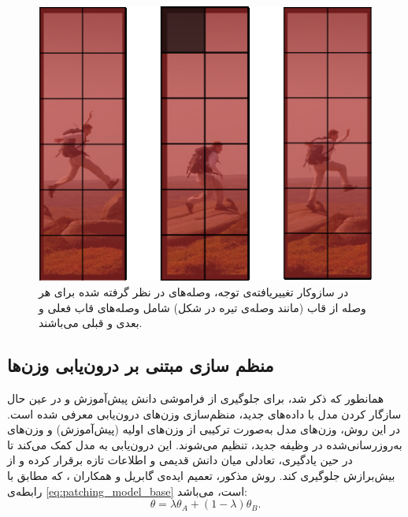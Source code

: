 ‌\begin{figure}
	\centering\includegraphics[scale=.50]{Images/Chapter3/openvclip_attention.png}
	\caption[]{در سازوکار تغییریافته‌ی توجه، وصله‌های در نظر گرفته شده برای هر وصله از قاب (مانند وصله‌ی تیره در شکل) شامل وصله‌های قاب فعلی و بعدی و قبلی می‌باشند.}
	\label{fig.31}
\end{figure}

\subsection{منظم سازی مبتنی بر درون‌یابی وزن‌ها}
همانطور که ذکر شد، برای جلوگیری از فراموشی دانش پیش‌آموزش و در عین حال سازگار کردن مدل با داده‌های جدید، منظم‌سازی وزن‌های درون‌یابی معرفی شده است. در این روش، وزن‌های مدل به‌صورت ترکیبی از وزن‌های اولیه (پیش‌آموزش) و وزن‌های به‌روزرسانی‌شده در وظیفه جدید، تنظیم می‌شوند. این درون‌یابی به مدل کمک می‌کند تا در حین یادگیری، تعادلی میان دانش قدیمی و اطلاعات تازه برقرار کرده و از بیش‌برازش
  جلوگیری کند. روش مذکور، تعمیم ایده‌ی گابریل و همکاران
  \cite{patchingmodels}،
 که مطابق با رابطه‌ی \eqref{eq:patching_model_base} است، می‌باشد:
\begin{equation}\label{eq:patching_model_base}
\theta = \lambda \theta_A + (1 - \lambda) \theta_B.
\end{equation}

